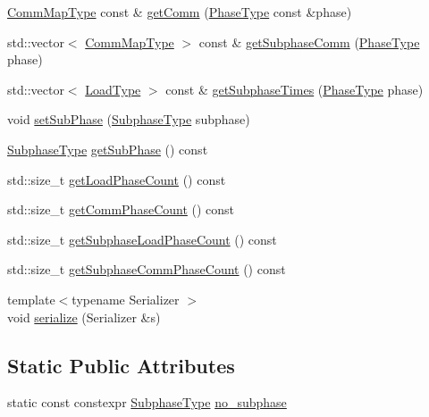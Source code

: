\begin{DoxyCompactItemize}
\item 
\hyperlink{namespacevt_1_1elm_a38487cb8896b9b4763efa9022fab560e}{Comm\+Map\+Type} const  \& \hyperlink{structvt_1_1elm_1_1_element_l_b_data_a9a59e8546283b731702d07f2360d527d}{get\+Comm} (\hyperlink{namespacevt_a46ce6733d5cdbd735d561b7b4029f6d7}{Phase\+Type} const \&phase)
\item 
std\+::vector$<$ \hyperlink{namespacevt_1_1elm_a38487cb8896b9b4763efa9022fab560e}{Comm\+Map\+Type} $>$ const  \& \hyperlink{structvt_1_1elm_1_1_element_l_b_data_a32d430c814238614d01cc4bc87c3b22b}{get\+Subphase\+Comm} (\hyperlink{namespacevt_a46ce6733d5cdbd735d561b7b4029f6d7}{Phase\+Type} phase)
\item 
std\+::vector$<$ \hyperlink{namespacevt_a8fb51741340b87d7aaee0bef60e9896b}{Load\+Type} $>$ const  \& \hyperlink{structvt_1_1elm_1_1_element_l_b_data_a60f723efc5e2ce332d3aeb7f72738306}{get\+Subphase\+Times} (\hyperlink{namespacevt_a46ce6733d5cdbd735d561b7b4029f6d7}{Phase\+Type} phase)
\item 
void \hyperlink{structvt_1_1elm_1_1_element_l_b_data_a93c02f4370d1622fefe6a63f0f360d96}{set\+Sub\+Phase} (\hyperlink{namespacevt_ae78cbfdf1e57470e33eedb074f2beeba}{Subphase\+Type} subphase)
\item 
\hyperlink{namespacevt_ae78cbfdf1e57470e33eedb074f2beeba}{Subphase\+Type} \hyperlink{structvt_1_1elm_1_1_element_l_b_data_a00c4afedbaa4b2cbebf877ea194297c3}{get\+Sub\+Phase} () const
\item 
std\+::size\+\_\+t \hyperlink{structvt_1_1elm_1_1_element_l_b_data_a2caf9adf8c33a1d2dda021388b84bb00}{get\+Load\+Phase\+Count} () const
\item 
std\+::size\+\_\+t \hyperlink{structvt_1_1elm_1_1_element_l_b_data_a5164aaf6b9aa619465454b7d24273f10}{get\+Comm\+Phase\+Count} () const
\item 
std\+::size\+\_\+t \hyperlink{structvt_1_1elm_1_1_element_l_b_data_ab8778cab537f8428281088d47c18eebc}{get\+Subphase\+Load\+Phase\+Count} () const
\item 
std\+::size\+\_\+t \hyperlink{structvt_1_1elm_1_1_element_l_b_data_ae042437f8dcaff5822b670b73b4e724b}{get\+Subphase\+Comm\+Phase\+Count} () const
\item 
{\footnotesize template$<$typename Serializer $>$ }\\void \hyperlink{structvt_1_1elm_1_1_element_l_b_data_a621cfc47dbcd0505e25d9060a78f080f}{serialize} (Serializer \&s)
\end{DoxyCompactItemize}
\subsection*{Static Public Attributes}
\begin{DoxyCompactItemize}
\item 
static const constexpr \hyperlink{namespacevt_ae78cbfdf1e57470e33eedb074f2beeba}{Subphase\+Type} \hyperlink{structvt_1_1elm_1_1_element_l_b_data_af93ba399701c539f3acbe75095e0d080}{no\+\_\+subphase}
\end{DoxyCompactItemize}
